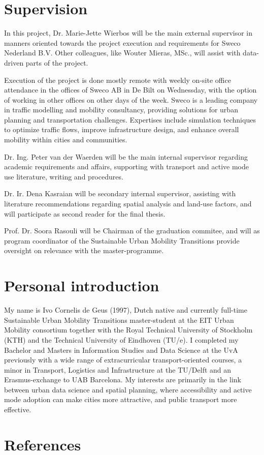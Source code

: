 \documentclass[sigconf, natbib=false, nonacm]{acmart}
\begin{document}
    \section{Supervision}
        In this project, Dr. Marie-Jette Wierbos will be the main external supervisor in manners oriented towards the project execution and requirements for Sweco Nederland B.V. Other colleagues, like Wouter Mieras, MSc., will assist with data-driven parts of the project. 
        
        Execution of the project is done mostly remote with weekly on-site office attendance in the offices of Sweco AB in De Bilt on Wednessday, with the option of working in other offices on other days of the week. Sweco is a leading company in traffic modelling and mobility consultancy, providing solutions for urban planning and transportation challenges. Expertises include simulation techniques to optimize traffic flows, improve infrastructure design, and enhance overall mobility within cities and communities.

        Dr. Ing. Peter van der Waerden will be the main internal supervisor regarding academic requirements and affairs, supporting with transport and active mode use literature, writing and procedures. 

        Dr. Ir. Dena Kasraian will be secondary internal supervisor, assisting with literature recommendations regarding spatial analysis and land-use factors, and will participate as second reader for the final thesis. 

        Prof. Dr. Soora Rasouli will be Chairman of the graduation commitee, and will as program coordinator of the Sustainable Urban Mobility Transitions provide oversight on relevance with the master-programme.        

\section{Personal introduction}\label{section:author_IG}
    My name is Ivo Cornelis de Geus (1997), Dutch native and currently full-time Sustainable Urban Mobility Transitions master-student at the EIT Urban Mobility consortium together with the Royal Technical University of Stockholm (KTH) and the Technical University of Eindhoven (TU/e). I completed my Bachelor and Masters in Information Studies and Data Science at the UvA previously with a wide range of extracurricular transport-oriented courses, a minor in Transport, Logistics and Infrastructure at the TU/Delft and an Erasmus-exchange to UAB Barcelona. My interests are primarily in the link between urban data science and spatial planning, where accessibility and active mode adoption can make cities more attractive, and public transport more effective.  
    
\newpage
\section{References}
\printbibliography[heading=none]
\end{document}
